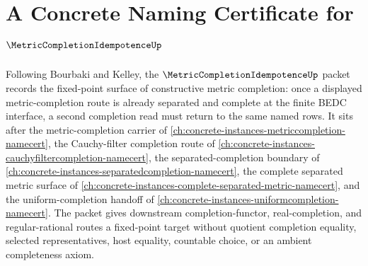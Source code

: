 \chapter{A Concrete Naming Certificate for $\MetricCompletionIdempotenceUp$}
\label{ch:concrete-instances-metric-completion-idempotence-namecert}

Following Bourbaki and Kelley, the $\MetricCompletionIdempotenceUp$ packet records the fixed-point surface of constructive metric completion: once a displayed metric-completion route is already separated and complete at the finite BEDC interface, a second completion read must return to the same named rows. It sits after the metric-completion carrier of \autoref{ch:concrete-instances-metriccompletion-namecert}, the Cauchy-filter completion route of \autoref{ch:concrete-instances-cauchyfiltercompletion-namecert}, the separated-completion boundary of \autoref{ch:concrete-instances-separatedcompletion-namecert}, the complete separated metric surface of \autoref{ch:concrete-instances-complete-separated-metric-namecert}, and the uniform-completion handoff of \autoref{ch:concrete-instances-uniformcompletion-namecert}. The packet gives downstream completion-functor, real-completion, and regular-rational routes a fixed-point target without quotient completion equality, selected representatives, host equality, countable choice, or an ambient completeness axiom.

